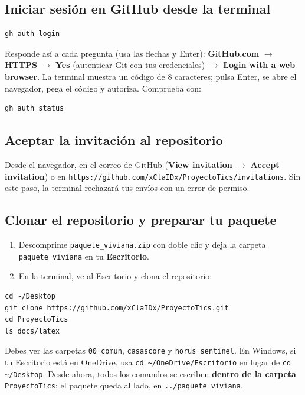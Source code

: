 \documentclass[11pt,a4paper]{article}
\begin{document}
\subsection{Iniciar sesión en GitHub desde la terminal}
\begin{lstlisting}
gh auth login
\end{lstlisting}

\noindent Responde así a cada pregunta (usa las flechas y Enter): \textbf{GitHub.com} $\rightarrow$ \textbf{HTTPS} $\rightarrow$ \textbf{Yes} (autenticar Git con tus credenciales) $\rightarrow$ \textbf{Login with a web browser}. La terminal muestra un código de 8 caracteres; pulsa Enter, se abre el navegador, pega el código y autoriza. Comprueba con:

\begin{lstlisting}
gh auth status
\end{lstlisting}

\subsection{Aceptar la invitación al repositorio}
Desde el navegador, en el correo de GitHub (\textbf{View invitation} $\rightarrow$ \textbf{Accept invitation}) o en \nolinkurl{https://github.com/xClaIDx/ProyectoTics/invitations}. Sin este paso, la terminal rechazará tus envíos con un error de permiso.

\subsection{Clonar el repositorio y preparar tu paquete}
\begin{enumerate}[leftmargin=*]
    \item Descomprime \texttt{paquete\_viviana.zip} con doble clic y deja la carpeta \texttt{paquete\_viviana} en tu \textbf{Escritorio}.
    \item En la terminal, ve al Escritorio y clona el repositorio:
\end{enumerate}

\begin{lstlisting}
cd ~/Desktop
git clone https://github.com/xClaIDx/ProyectoTics.git
cd ProyectoTics
ls docs/latex
\end{lstlisting}

\noindent Debes ver las carpetas \texttt{00\_comun}, \texttt{casascore} y \texttt{horus\_sentinel}. En Windows, si tu Escritorio está en OneDrive, usa \nolinkurl{cd ~/OneDrive/Escritorio} en lugar de \nolinkurl{cd ~/Desktop}. Desde ahora, todos los comandos se escriben \textbf{dentro de la carpeta} \texttt{ProyectoTics}; el paquete queda al lado, en \nolinkurl{../paquete_viviana}.
\end{document}
